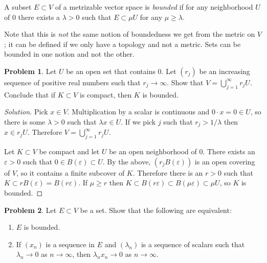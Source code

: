 \documentclass[11pt]{article}
\theoremstyle{definition}
\newtheorem{prob}{Problem}
\begin{document}
A subset $E \subset V$ of a metrizable vector space is \emph{bounded} if for
any neighborhood $U$ of $0$ there exists a $\lambda > 0$ such that $E
\subset \mu U$ for any $\mu \geq \lambda$.

Note that this is \emph{not} the same notion of boundedness we get from the
metric on $V$; it can be defined if we only have a topology and not a metric.
Sets can be bounded in one notion and not the other.


\begin{prob}
Let $U$ be an open set that contains $0$.
Let $(r_j)$ be an increasing sequence of positive real numbers such that $r_j
\to \infty$. Show that $V = \bigcup_{j=1}^\infty r_j U$.
Conclude that if $K \subset V$ is compact, then $K$ is bounded.
\end{prob}


\begin{proof}[Solution]
Pick $x \in V$.
Multiplication by a scalar is continuous and $0 \cdot x = 0 \in U$,
so there is some $\lambda > 0$ such that $\lambda x \in U$.
If we pick $j$ such that $r_j > 1/\lambda$ then $x \in r_j U$.
Therefore $V = \bigcup_{j=1}^\infty r_j U$.

Let $K \subset V$ be compact and let $U$ be an open neighborhood of $0$.
There exists an $\varepsilon > 0$ such that $0 \in B(\varepsilon) \subset U$.
By the above, $(r_j B(\varepsilon))$ is an open covering of $V$, so it contains
a finite subcover of $K$. Therefore there is an $r > 0$ such that $K \subset r
B(\varepsilon) = B(r \varepsilon)$.
If $\mu \geq r$ then $K \subset B(r \varepsilon) \subset B(\mu \varepsilon)
\subset \mu U$, so $K$ is bounded.
\end{proof}


\begin{prob}
Let $E \subset V$ be a set.
Show that the following are equivalent:
\begin{enumerate}
\item
$E$ is bounded.

\item
If $(x_n)$ is a sequence in $E$ and $(\lambda_n)$ is a sequence of scalars such
that $\lambda_n \to 0$ as $n \to \infty$, then $\lambda_n x_n \to 0$ as $n \to
\infty$.
\end{enumerate}
\end{prob}
\end{document}
